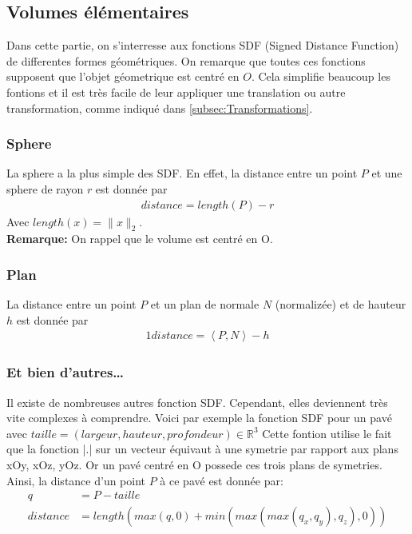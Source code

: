 \subsection{Volumes élémentaires}
Dans cette partie, on s'interresse aux fonctions SDF (Signed Distance Function) de differentes formes géométriques. On remarque que toutes ces fonctions supposent que l'objet géometrique est centré en $O$. Cela simplifie beaucoup les fontions et il est très facile de leur appliquer une translation ou autre transformation, comme indiqué dans \ref{subsec:Transformations}.
\subsubsection{Sphere}
La sphere a la plus simple des SDF. En effet, la distance entre un point $P$ et une sphere de rayon $r$ est donnée par 
\begin{align*}
distance=length(P)-r
\end{align*}
Avec $length(x)=\|x\|_2$.
\\\textbf{Remarque:} On rappel que le volume est centré en O.
\subsubsection{Plan}
La distance entre un point $P$ et un plan de normale $N$ (normalizée) et de hauteur $h$ est donnée par 
\begin{alignat*}{1}
    distance=\left\langle P,N \right\rangle - h
\end{alignat*}
\subsubsection{Et bien d'autres\ldots}
Il existe de nombreuses autres fonction SDF. Cependant, elles deviennent très vite complexes à comprendre. Voici par exemple la fonction SDF pour un pavé avec $taille=(largeur, hauteur, profondeur) \in \mathbb{R}^3$
Cette fontion utilise le fait que la fonction |.| sur un vecteur équivaut à une symetrie par rapport aux plans xOy, xOz, yOz. Or un pavé centré en O possede ces trois plans de symetries. Ainsi, la distance d'un point $P$ à ce pavé est donnée par:
\begin{align*}
    q&=P-taille\\
    distance&=length(max(q,0)+min(max(max(q_x,q_y),q_z),0))
\end{align*}